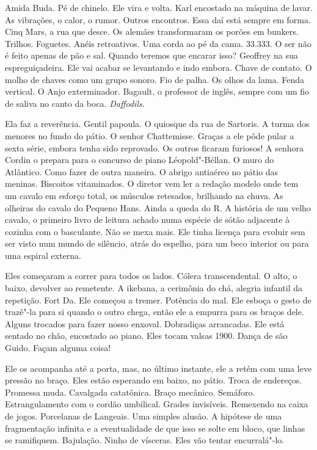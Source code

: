 Amida Buda. Pé de chinelo. Ele vira e volta. Karl encostado na máquina
de lavar. As vibrações, o calor, o rumor. Outros encontros. Essa daí
está sempre em forma. Cinq Mars, a rua que desce. Os alemães
transformaram os porões em bunkers. Trilhos. Foguetes. Anéis
retroativos. Uma corda ao pé da cama. 33.333. O ser não é feito apenas
de pão e sal. Quando teremos que encarar isso? Geoffrey na sua
espreguiçadeira. Ele vai acabar se levantando e indo embora. Chave de
contato. O molho de chaves como um grupo sonoro. Fio de palha. Os olhos
da lama. Fenda vertical. O Anjo exterminador. Bagault, o professor de
inglês, sempre com um fio de saliva no canto da boca. \emph{Daffodils}.

Ela faz a reverência. Gentil papoula. O quiosque da rua de Sartoris. A
turma dos menores no fundo do pátio. O senhor Chattemisse. Graças a ele
pôde pular a sexta série, embora tenha sido reprovado. Os outros ficaram
furiosos! A senhora Cordin o prepara para o concurso de piano
Léopold"-Béllan. O muro do Atlântico. Como fazer de outra maneira. O
abrigo antiaéreo no pátio das meninas. Biscoitos vitaminados. O diretor
vem ler a redação modelo onde tem um cavalo em esforço total, os
músculos retesados, brilhando na chuva. As olheiras do cavalo do Pequeno
Hans. Ainda a queda do R. A história de um velho cavalo, o primeiro
livro de leitura achado numa espécie de sótão adjacente à cozinha com o
basculante. Não se mexa mais. Ele tinha licença para evoluir sem ser
visto num mundo de silêncio, atrás do espelho, para um beco interior ou
para uma espiral externa.

Eles começaram a correr para todos os lados. Cólera transcendental. O
alto, o baixo, devolver ao remetente. A ikebana, a cerimônia do chá,
alegria infantil da repetição. Fort Da. Ele começou a tremer. Potência
do mal. Ele esboça o gesto de trazê"-la para si quando o outro chega,
então ele a empurra para os braços dele. Alguns trocados para fazer
nosso enxoval. Dobradiças arrancadas. Ele está sentado no chão,
encostado ao piano. Eles tocam valsas 1900. Dança de são Guido. Façam
alguma coisa!

Ele os acompanha até a porta, mas, no último instante, ele a retém com
uma leve pressão no braço. Eles estão esperando em baixo, no pátio.
Troca de endereços. Promessa muda. Cavalgada catatônica. Braço mecânico.
Semáforo. Estrangulamento com o cordão umbilical. Grades invisíveis.
Remexendo na caixa de jogos. Porcelanas de Langeais. Uma simples alusão.
A hipótese de uma fragmentação infinita e a eventualidade de que isso se
solte em bloco, que linhas se ramifiquem. Bajulação. Ninho de vísceras.
Eles vão tentar encurralá"-lo.

